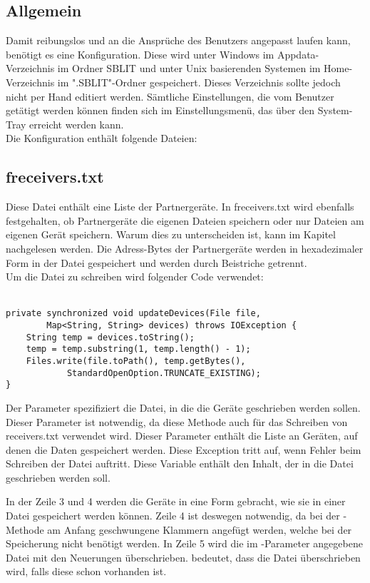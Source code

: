 \subsection{Allgemein}
Damit \sblit reibungslos und an die Ansprüche des Benutzers angepasst laufen kann, benötigt es eine Konfiguration. Diese wird unter Windows im Appdata-Verzeichnis im Ordner SBLIT und unter Unix basierenden Systemen im Home-Verzeichnis im ".SBLIT"-Ordner gespeichert. Dieses Verzeichnis sollte jedoch nicht per Hand editiert werden. Sämtliche Einstellungen, die vom Benutzer getätigt werden können finden sich im Einstellungsmenü, das über den System-Tray erreicht werden kann.\\
Die Konfiguration enthält folgende Dateien:
\subsection{freceivers.txt}
Diese Datei enthält eine Liste der Partnergeräte. In freceivers.txt wird ebenfalls festgehalten, ob Partnergeräte die eigenen Dateien speichern oder nur Dateien am eigenen Gerät speichern. Warum dies zu unterscheiden ist, kann im Kapitel  nachgelesen werden. Die Adress-Bytes der Partnergeräte werden in hexadezimaler Form in der Datei gespeichert und werden durch Beistriche getrennt. \\
Um die Datei zu schreiben wird folgender Code verwendet: \\  \\
\javalisting
\begin{minipage}{\linewidth}
\begin{lstlisting}[caption={Schreiben der Gerätedatei},captionpos=b]
private synchronized void updateDevices(File file,
		Map<String, String> devices) throws IOException {
	String temp = devices.toString();
	temp = temp.substring(1, temp.length() - 1);
	Files.write(file.toPath(), temp.getBytes(),
			StandardOpenOption.TRUNCATE_EXISTING);
}
\end{lstlisting}
\end{minipage}
\begin{description}
	Der Parameter spezifiziert die Datei, in die die Geräte geschrieben werden sollen. Dieser Parameter ist notwendig, da diese Methode auch für das Schreiben von receivers.txt  verwendet wird.
	Dieser Parameter enthält die Liste an Geräten, auf denen die Daten gespeichert werden.
	Diese Exception tritt auf, wenn Fehler beim Schreiben der Datei auftritt.
	Diese Variable enthält den Inhalt, der in die Datei geschrieben werden soll. 
\end{description}
In der Zeile 3 und 4 werden die Geräte in eine Form gebracht, wie sie in einer Datei gespeichert werden können. Zeile 4 ist deswegen notwendig, da bei der -Methode am Anfang geschwungene Klammern angefügt werden, welche bei der Speicherung nicht benötigt werden. In Zeile 5 wird die im -Parameter angegebene Datei mit den Neuerungen überschrieben.  bedeutet, dass die Datei überschrieben wird, falls diese schon vorhanden ist.

